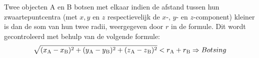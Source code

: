 Twee objecten A en B botsen met elkaar indien de afstand tussen hun zwaartepuntcentra (met \(x, y\) en \(z\) respectievelijk de \(x\)-, \(y\)- en \(z\)-component) kleiner is dan de som van hun twee radii, weergegeven door \(r\) in de formule. Dit wordt gecontroleerd met behulp van de volgende formule:
\begin{equation*}
\sqrt{(x\textsubscript{A}-x\textsubscript{B})\textsuperscript{2} + (y\textsubscript{A} - y\textsubscript{B})\textsuperscript{2} + (z\textsubscript{A} - z\textsubscript{B})\textsuperscript{2}}  < r\textsubscript{A} + r\textsubscript{B} \Rightarrow Botsing
\end{equation*}
